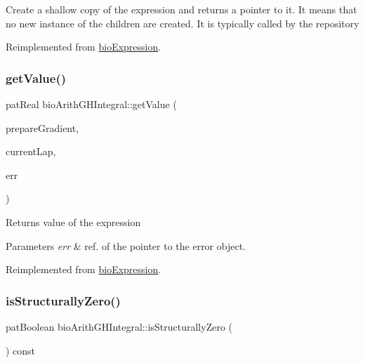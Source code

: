 Create a shallow copy of the expression and returns a pointer to it. It means that no new instance of the children are created. It is typically called by the repository 

Reimplemented from \hyperlink{classbio_expression_a442534762693b92baaf33928979a1bf8}{bio\+Expression}.

\mbox{\label{classbio_arith_g_h_integral_a6eecafaf8d88fc08dfc8c4feb2d68ffd}} 
\subsubsection{\texorpdfstring{get\+Value()}{getValue()}}
{\footnotesize\ttfamily pat\+Real bio\+Arith\+G\+H\+Integral\+::get\+Value (\begin{DoxyParamCaption}\item[{pat\+Boolean}]{prepare\+Gradient,  }\item[{pat\+U\+Long}]{current\+Lap,  }\item[{pat\+Error $\ast$\&}]{err }\end{DoxyParamCaption})\hspace{0.3cm}{\ttfamily [virtual]}}

\begin{DoxyReturn}{Returns}
value of the expression 
\end{DoxyReturn}

\begin{DoxyParams}{Parameters}
{\em err} & ref. of the pointer to the error object. \\
\hline
\end{DoxyParams}


Reimplemented from \hyperlink{classbio_expression_af58662a5d4d456f15bc4f2c9bd4f8a5b}{bio\+Expression}.

\mbox{\label{classbio_arith_g_h_integral_a86510e9d5d13234c931278ec496e1aec}} 
\subsubsection{\texorpdfstring{is\+Structurally\+Zero()}{isStructurallyZero()}}
{\footnotesize\ttfamily pat\+Boolean bio\+Arith\+G\+H\+Integral\+::is\+Structurally\+Zero (\begin{DoxyParamCaption}{ }\end{DoxyParamCaption}) const\hspace{0.3cm}{\ttfamily [virtual]}}

